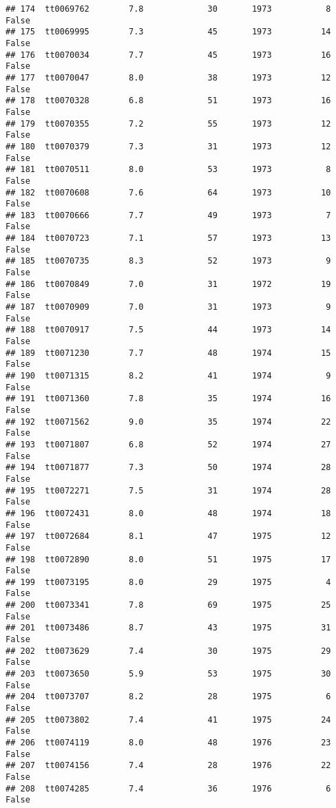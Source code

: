 \documentclass[
]{article}
\begin{document}
\begin{verbatim}
## 174  tt0069762        7.8             30       1973           8   False
## 175  tt0069995        7.3             45       1973          14   False
## 176  tt0070034        7.7             45       1973          16   False
## 177  tt0070047        8.0             38       1973          12   False
## 178  tt0070328        6.8             51       1973          16   False
## 179  tt0070355        7.2             55       1973          12   False
## 180  tt0070379        7.3             31       1973          12   False
## 181  tt0070511        8.0             53       1973           8   False
## 182  tt0070608        7.6             64       1973          10   False
## 183  tt0070666        7.7             49       1973           7   False
## 184  tt0070723        7.1             57       1973          13   False
## 185  tt0070735        8.3             52       1973           9   False
## 186  tt0070849        7.0             31       1972          19   False
## 187  tt0070909        7.0             31       1973           9   False
## 188  tt0070917        7.5             44       1973          14   False
## 189  tt0071230        7.7             48       1974          15   False
## 190  tt0071315        8.2             41       1974           9   False
## 191  tt0071360        7.8             35       1974          16   False
## 192  tt0071562        9.0             35       1974          22   False
## 193  tt0071807        6.8             52       1974          27   False
## 194  tt0071877        7.3             50       1974          28   False
## 195  tt0072271        7.5             31       1974          28   False
## 196  tt0072431        8.0             48       1974          18   False
## 197  tt0072684        8.1             47       1975          12   False
## 198  tt0072890        8.0             51       1975          17   False
## 199  tt0073195        8.0             29       1975           4   False
## 200  tt0073341        7.8             69       1975          25   False
## 201  tt0073486        8.7             43       1975          31   False
## 202  tt0073629        7.4             30       1975          29   False
## 203  tt0073650        5.9             53       1975          30   False
## 204  tt0073707        8.2             28       1975           6   False
## 205  tt0073802        7.4             41       1975          24   False
## 206  tt0074119        8.0             48       1976          23   False
## 207  tt0074156        7.4             28       1976          22   False
## 208  tt0074285        7.4             36       1976           6   False

\end{verbatim}
\end{document}
